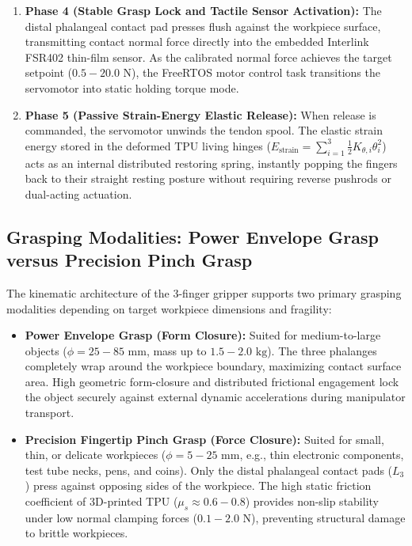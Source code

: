\documentclass[12pt,a4paper]{report}
\begin{document}
\begin{enumerate}
    \item \textbf{Phase 4 (Stable Grasp Lock and Tactile Sensor Activation):} The distal phalangeal contact pad presses flush against the workpiece surface, transmitting contact normal force directly into the embedded Interlink FSR402 thin-film sensor. As the calibrated normal force achieves the target setpoint ($0.5 - 20.0\text{ N}$), the FreeRTOS motor control task transitions the servomotor into static holding torque mode.
    \item \textbf{Phase 5 (Passive Strain-Energy Elastic Release):} When release is commanded, the servomotor unwinds the tendon spool. The elastic strain energy stored in the deformed TPU living hinges ($E_{\text{strain}} = \sum_{i=1}^3 \frac{1}{2} K_{\theta, i} \theta_i^2$) acts as an internal distributed restoring spring, instantly popping the fingers back to their straight resting posture without requiring reverse pushrods or dual-acting actuation.
\end{enumerate}

\subsection{Grasping Modalities: Power Envelope Grasp versus Precision Pinch Grasp}
The kinematic architecture of the 3-finger gripper supports two primary grasping modalities depending on target workpiece dimensions and fragility:
\begin{itemize}
    \item \textbf{Power Envelope Grasp (Form Closure):} Suited for medium-to-large objects ($\phi = 25 - 85\text{ mm}$, mass up to $1.5 - 2.0\text{ kg}$). The three phalanges completely wrap around the workpiece boundary, maximizing contact surface area. High geometric form-closure and distributed frictional engagement lock the object securely against external dynamic accelerations during manipulator transport.
    \item \textbf{Precision Fingertip Pinch Grasp (Force Closure):} Suited for small, thin, or delicate workpieces ($\phi = 5 - 25\text{ mm}$, e.g., thin electronic components, test tube necks, pens, and coins). Only the distal phalangeal contact pads ($L_3$) press against opposing sides of the workpiece. The high static friction coefficient of 3D-printed TPU ($\mu_s \approx 0.6 - 0.8$) provides non-slip stability under low normal clamping forces ($0.1 - 2.0\text{ N}$), preventing structural damage to brittle workpieces.
\end{itemize}
\end{document}
